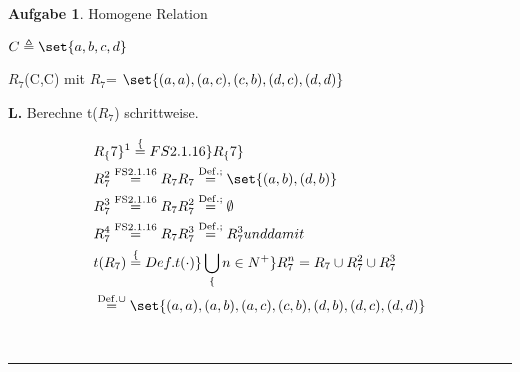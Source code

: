 \documentclass[10pt,leqno ]{article}
\DeclarePairedDelimiter\set\{\}
\newcommand\customeq[1]{\overset{\mathrm{#1}}{=}}
\theoremstyle{definition}
\newtheorem{problem}[theorem]{Aufgabe}
\newenvironment{solution}[1][L]{\begin{doublespace}\textbf{#1.}\quad }{\ \rule{0.5em}{0.5em}\end{doublespace}}
\begin{document}
\begin{problem}
Homogene Relation
\end{problem}

   \( C \triangleq \set \{ a,b,c,d \} \)

   $R_7$(C,C) mit $R_7$= \( \set \{ (a,a),(a,c),(c,b),(d,c),(d,d) \} \)

\begin{solution}
Berechne t(\(R_7\)) schrittweise.

\begin{equation*}
    
   \begin{aligned}
    & R_\{7\}^1 \customeq\{FS 2.1.16\} R_\{7\}\\
    & R_{7}^2 \customeq{FS 2.1.16} R_{7}R_{7} \customeq{Def. ;} \set{(a,b),(d,b)}\\
    & R_{7}^3 \customeq{FS 2.1.16} R_{7}R_7^2 \customeq{Def. ;} \emptyset\\
    & R_{7}^4 \customeq{FS 2.1.16} R_{7}R_7^3 \customeq{Def. ;} R_7^3 und damit\\
    & t(R_7) \customeq\{Def. t(\cdot)\} \bigcup\limits_\{n \in N^+\} R_7^n = R_7 \cup R_7^2 \cup R_7^3\\
    & \customeq{Def. \cup} \set{(a,a),(a,b),(a,c),(c,b),(d,b),(d,c),(d,d)}
   \end{aligned}

\end{equation*}

\end{solution}
\end{document}
